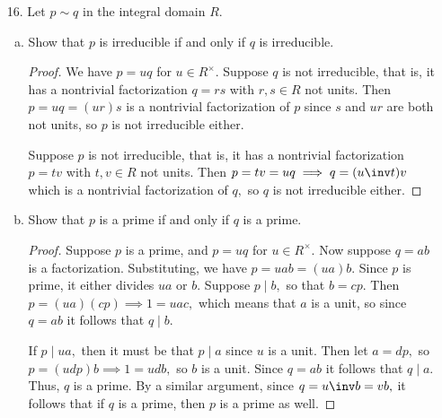 \documentclass{article}
\begin{document}
\begin{itemize}
\begin{enumerate}[(a)]
\begin{proof}
					To show that $p$ is not prime, use a similar argument to part (a). Since
					\[\left( 1+2\sqrt{-5} \right)\left( 2-\sqrt{-5} \right) = 21 = 3\cdot7\]
					suppose that $p$ divides 3, so that
					\begin{align*}
						3 &= \left( 1+2\sqrt{-5} \right)\left( a+b\sqrt{-5} \right) \\
						&= (a-10b) + (2a+b)\sqrt{-5} \\
						\implies 2a+b &= 0 \implies b=-2a \implies a-10(-2a) = 21a = 3
					\end{align*}
					This has no solution, so $p$ does not divide 3, so it is not prime, as desired.
				\end{proof}
				
		\end{enumerate}

		\newpage
	\item[16.] Let $p\sim q$ in the integral domain $R.$ 

		\begin{enumerate}[(a)]
			\item Show that $p$ is irreducible if and only if $q$ is irreducible.
				\begin{proof}
					We have $p=uq$ for $u\in R^\times.$ Suppose $q$ is not irreducible, that is, it has a nontrivial factorization $q=rs$ with $r, s\in R$ not units. Then $p=uq=(ur)s$ is a nontrivial factorization of $p$ since $s$ and $ur$ are both not units, so $p$ is not irreducible either. 
					
					Suppose $p$ is not irreducible, that is, it has a nontrivial factorization $p=tv$ with $t, v\in R$ not units. Then $p=tv=uq\implies q=(u\inv t)v$ which is a nontrivial factorization of $q,$ so $q$ is not irreducible either.
				\end{proof}

			\item Show that $p$ is a prime if and only if $q$ is a prime.
				\begin{proof}
					Suppose $p$ is a prime, and $p=uq$ for $u\in R^\times.$ Now suppose $q=ab$ is a factorization. Substituting, we have $p=uab=(ua)b.$ Since $p$ is prime, it either divides $ua$ or $b.$ Suppose $p\mid b,$ so that $b=cp.$ Then $p=(ua)(cp)\implies 1=uac,$ which means that $a$ is a unit, so since $q=ab$ it follows that $q\mid b.$ 

					If $p\mid ua,$ then it must be that $p\mid a$ since $u$ is a unit. Then let $a=dp,$ so $p=(udp)b\implies 1=udb,$ so $b$ is a unit. Since $q=ab$ it follows that $q\mid a.$ Thus, $q$ is a prime. By a similar argument, since $q=u\inv b=vb,$ it follows that if $q$ is a prime, then $p$ is a prime as well.
				\end{proof}


\end{enumerate}
\end{itemize}
\end{document}
